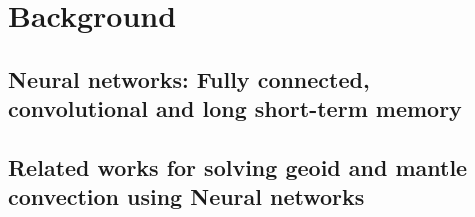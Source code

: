\chapter{Background}\label{chap:background}


\section{Neural networks: Fully connected, convolutional and long short-term memory}

\section{Related works for solving geoid and mantle convection using Neural networks}